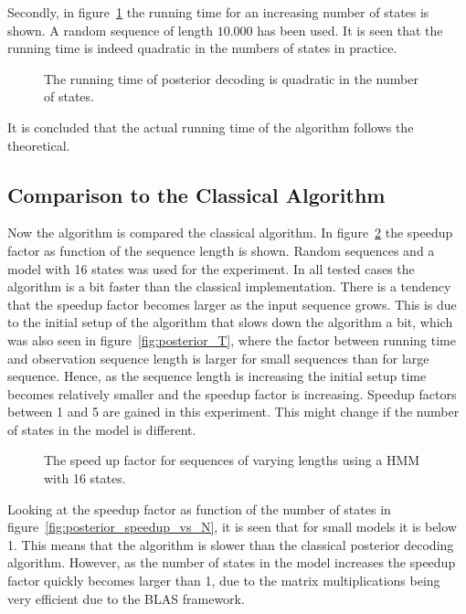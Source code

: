 Secondly, in figure~\ref{fig:posterior_N} the running time for an increasing
number of states is shown. A random sequence of length $10.000$ has been used. It
is seen that the running time is indeed quadratic in the numbers of states
in practice.

\begin{figure}
  \centering
  
  \caption{The running time of posterior decoding is quadratic in the number of
    states.}
  \label{fig:posterior_N}
\end{figure}

It is concluded that the actual running time of the algorithm follows the
theoretical.

\subsection{Comparison to the Classical Algorithm}
\label{sec:comp-class-algor}

Now the algorithm is compared the classical algorithm. In
figure~\ref{fig:posterior_speedup_vs_sequence_length} the speedup factor as
function of the sequence length is shown. Random sequences and a model with 16
states was used for the experiment. In all tested cases the algorithm is a bit
faster than the classical implementation. There is a tendency that the speedup
factor becomes larger as the input sequence grows. This is due to the initial
setup of the algorithm that slows down the algorithm a bit, which was also seen
in figure~\ref{fig:posterior_T}, where the factor between running time and
observation sequence length is larger for small sequences than for large
sequence. Hence, as the sequence length is increasing the initial setup time
becomes relatively smaller and the speedup factor is increasing. Speedup
factors between 1 and 5 are gained in this experiment. This might change if the
number of states in the model is different. 

\begin{figure}
  \centering
  
  \caption{The speed up factor for sequences of varying lengths using a HMM
    with 16 states.}
  \label{fig:posterior_speedup_vs_sequence_length}
\end{figure}

Looking at the speedup factor as function of the number of states in
figure~\ref{fig:posterior_speedup_vs_N}, it is seen that for small models it is
below 1. This means that the algorithm is slower than the classical posterior
decoding algorithm. However, as the number of states in the model increases the
speedup factor quickly becomes larger than 1, due to the matrix multiplications
being very efficient due to the BLAS framework.  

